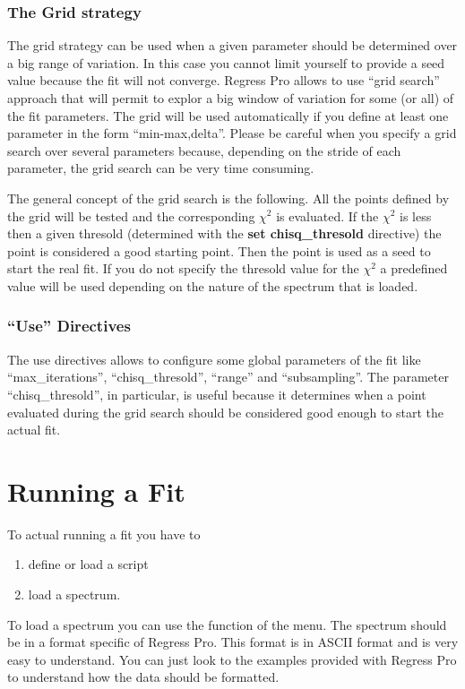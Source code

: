 \documentclass[a4paper]{report}
\begin{document}
\subsection{The Grid strategy}
The grid strategy can be used when a given parameter should be
determined over a big range of variation. In this case you cannot
limit yourself to provide a seed value because the fit will not
converge. Regress Pro allows to use ``grid search'' approach that will
permit to explor a big window of variation for some (or all) of the
fit parameters. The grid will be used automatically if you define at
least one parameter in the form ``min-max,delta''. Please be careful
when you specify a grid search over several parameters because,
depending on the stride of each parameter, the grid search can be very
time consuming.

The general concept of the grid search is the following. All the
points defined by the grid will be tested and the corresponding
$\chi^2$ is evaluated. If the $\chi^2$ is less then a given thresold
(determined with the \textbf{set chisq\_thresold} directive) the point
is considered a good starting point. Then the point is used as a seed
to start the real fit. If you do not specify the thresold value for
the $\chi^2$ a predefined value will be used depending on the nature
of the spectrum that is loaded.

\subsection{``Use'' Directives}
The use directives allows to configure some global parameters of the
fit like ``max\_iterations'', ``chisq\_thresold'', ``range'' and
``subsampling''. The parameter ``chisq\_thresold'', in particular, is
useful because it determines when a point evaluated during the grid
search should be considered good enough to start the actual fit.

\chapter{Running a Fit}
To actual running a fit you have to
\begin{enumerate}
  \item define or load a script
  \item load a spectrum.
\end{enumerate}
To load a spectrum you can use the function of the menu. The spectrum
should be in a format specific of Regress Pro. This format is in ASCII
format and is very easy to understand. You can just look to the
examples provided with Regress Pro to understand how the data should
be formatted.
\end{document}

